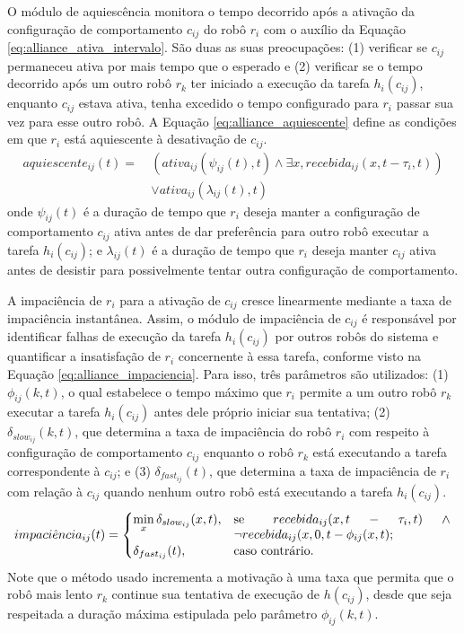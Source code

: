     O módulo de aquiescência monitora o tempo decorrido após a ativação da configuração de comportamento $c_{ij}$ do robô $r_i$ com o auxílio da Equação \ref{eq:alliance_ativa_intervalo}. São duas as suas preocupações: (1) verificar se $c_{ij}$ permaneceu ativa por mais tempo que o esperado e (2) verificar se o tempo decorrido após um outro robô $r_k$ ter iniciado a execução da tarefa $h_i(c_{ij})$, enquanto $c_{ij}$ estava ativa, tenha excedido o tempo configurado para $r_i$ passar sua vez para esse outro robô. A Equação \ref{eq:alliance_aquiescente} define as condições em que $r_i$ está aquiescente à desativação de $c_{ij}$.
    \begin{equation} \label{eq:alliance_aquiescente}
        \begin{aligned}
            aquiescente_{ij}(t) = \
            & (ativa_{ij}(\psi_{ij}(t), t) \land \exists x, recebida_{ij}(x, t - \tau_i, t)) \\
            & \lor ativa_{ij}(\lambda_{ij}(t), t)
        \end{aligned}
    \end{equation}
    onde $\psi_{ij}(t)$ é a duração de tempo que $r_i$ deseja manter a configuração de comportamento $c_{ij}$ ativa antes de dar preferência para outro robô executar a tarefa $h_i(c_{ij})$; e $\lambda_{ij}(t)$ é a duração de tempo que $r_i$ deseja manter $c_{ij}$ ativa antes de desistir para possivelmente tentar outra configuração de comportamento.
    
    A impaciência de $r_i$ para a ativação de $c_{ij}$ cresce linearmente mediante a taxa de impaciência instantânea. Assim, o módulo de impaciência de $c_{ij}$ é responsável por identificar falhas de execução da tarefa $h_i(c_{ij})$ por outros robôs do sistema e quantificar a insatisfação de $r_i$ concernente à essa tarefa, conforme visto na Equação \ref{eq:alliance_impaciencia}. Para isso, três parâmetros são utilizados: (1) $\phi_{ij}(k, t)$, o qual estabelece o tempo máximo que $r_i$ permite a um outro robô $r_k$ executar a tarefa $h_i(c_{ij})$ antes dele próprio iniciar sua tentativa; (2) $\delta_{slow_{ij}}(k, t)$, que determina a taxa de impaciência do robô $r_i$ com respeito à configuração de comportamento $c_{ij}$ enquanto o robô $r_k$ está executando a tarefa correspondente à $c_{ij}$; e (3) $\delta_{fast_{ij}}(t)$, que determina a taxa de impaciência de $r_i$ com relação à $c_{ij}$ quando nenhum outro robô está executando a tarefa $h_i(c_{ij})$.
    \begin{equation} \label{eq:alliance_impaciencia}
        impaci\hat{e}ncia_{ij}(t) =
        \begin{cases}
            \min\limits_{x}\delta_{slow_{ij}}(x, t), & \parbox[t]{.5\textwidth}{se $recebida_{ij}(x, t - \tau_i, t) \land \lnot recebida_{ij}(x, 0, t - \phi_{ij}(x, t)$;} \\
            \delta_{fast_{ij}}(t), & \text{caso contrário.}
        \end{cases}
    \end{equation}
    Note que o método usado incrementa a motivação à uma taxa que permita que o robô mais lento $r_k$ continue sua tentativa de execução de $h(c_{ij})$, desde que seja respeitada a duração máxima estipulada pelo parâmetro $\phi_{ij}(k, t)$.
    
